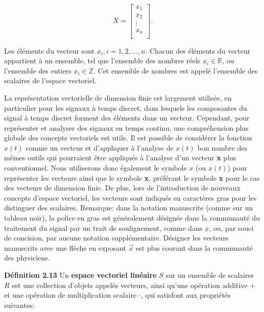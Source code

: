 \documentclass[11pt,twoside,a4paper]{article}
\begin{document}
\begin{equation*}
  X = \begin{bmatrix}
    x_1 \\
    x_2 \\
    \vdots \\
    x_n \\
  \end{bmatrix}.
\end{equation*}

\noindent
Les éléments du vecteur sont $x_i,i = 1, 2, \ldots, n$. 
Chacun des éléments du vecteur appartient à un ensemble, tel que l'ensemble des nombres réels $x_i \in \mathbb{R}$, ou l'ensemble des entiers $x_i \in \mathbb{Z}$. 
Cet ensemble de nombres est appelé l'ensemble des scalaires de l'espace vectoriel.

La représentation vectorielle de dimension finie est largement utilisée, en particulier pour les signaux à temps discret, dans lesquels les composantes du signal à temps discret forment des éléments dans un vecteur. 
Cependant, pour représenter et analyser des signaux en temps continu, une compréhension plus globale des concepts vectoriels est utile. 
Il est possible de considérer la fonction $x(t)$ comme un vecteur et d'appliquer à l'analyse de $x(t)$ bon nombre des mêmes outils qui pourraient être appliqués à l'analyse d'un vecteur \textbf{x} plus conventionnel. 
Nous utiliserons donc également le symbole $x$ (ou $x(t)$) pour représenter les vecteurs ainsi que le symbole \textbf{x}, préférant le symbole \textbf{x} pour le cas des vecteurs de dimension finie. 
De plus, lors de l'introduction de nouveaux concepts d'espace vectoriel, les vecteurs sont indiqués en caractères gras pour les distinguer des scalaires. 
Remarque: dans la notation manuscrite (comme sur un tableau noir), la police en gras est généralement désignée dans la communauté du traitement du signal par un trait de soulignement, comme dans $\underline{x}$, ou, par souci de concision, par aucune notation supplémentaire. 
Désigner les vecteurs manuscrits avec une flèche en exposant $\overrightarrow{x}$ est plus courant dans la communauté des physiciens.
\vspace{4mm}

\textbf{Définition 2.13} Un \textbf{espace vectoriel linéaire} $S$ sur un ensemble de scalaires $R$ est une collection d'objets appelés vecteurs, ainsi qu'une opération additive $+$ et une opération de multiplication scalaire $\cdot$, qui satisfont aux propriétés suivantes:
\end{document}

